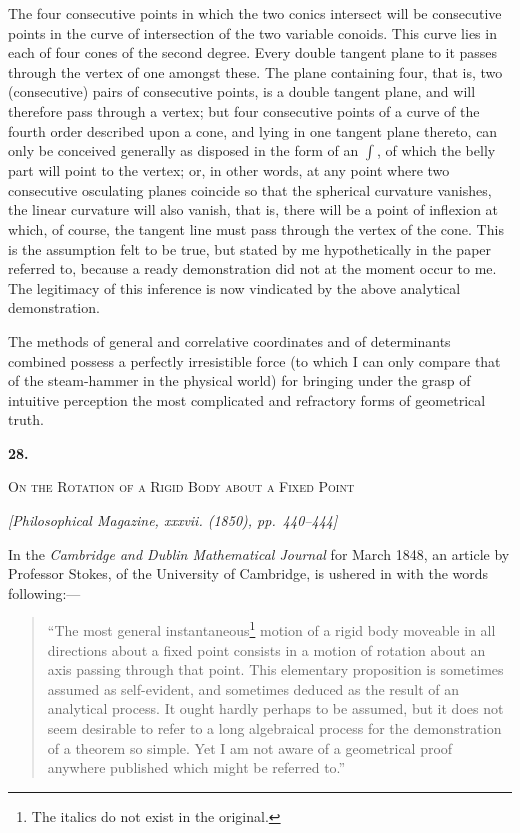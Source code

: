 \documentclass[11pt]{article}
\newcommand{\paperhead}[3]{%
  \clearpage
  \begin{center}
  {\Large\bfseries #1.}\par\vspace{0.85em}
  {\large\scshape #2}\par\vspace{0.6em}
  {\itshape [#3]}\par
  \end{center}\vspace{0.4em}}
\newcommand{\sourcepage}[1]{\marginpar{\scriptsize p.~#1}}
\begin{document}
{{\sourcepage{156}
The four consecutive points in which the two conics intersect will be consecutive points in the curve of intersection of the two variable conoids. This curve lies in each of four cones of the second degree. Every double tangent plane to it passes through the vertex of one amongst these. The plane containing four, that is, two (consecutive) pairs of consecutive points, is a double tangent plane, and will therefore pass through a vertex; but four consecutive points of a curve of the fourth order described upon a cone, and lying in one tangent plane thereto, can only be conceived generally as disposed in the form of an $\int$, of which the belly part will point to the vertex; or, in other words, at any point where two consecutive osculating planes coincide so that the spherical curvature vanishes, the linear curvature will also vanish, that is, there will be a point of inflexion at which, of course, the tangent line must pass through the vertex of the cone. This is the assumption felt to be true, but stated by me hypothetically in the paper referred to, because a ready demonstration did not at the moment occur to me. The legitimacy of this inference is now vindicated by the above analytical demonstration.

The methods of general and correlative coordinates and of determinants combined possess a perfectly irresistible force (to which I can only compare that of the steam-hammer in the physical world) for bringing under the grasp of intuitive perception the most complicated and refractory forms of geometrical truth.

\paperhead{28}{On the Rotation of a Rigid Body about a Fixed Point}{Philosophical Magazine, xxxvii. (1850), pp.~440--444}

\sourcepage{157}
In the \emph{Cambridge and Dublin Mathematical Journal} for March 1848, an article by Professor Stokes, of the University of Cambridge, is ushered in with the words following:---
\begin{quotation}
``The most general instantaneous\footnote{The italics do not exist in the original.} motion of a rigid body moveable in all directions about a fixed point consists in a motion of rotation about an axis passing through that point. This elementary proposition is sometimes assumed as self-evident, and sometimes deduced as the result of an analytical process. It ought hardly perhaps to be assumed, but it does not seem desirable to refer to a long algebraical process for the demonstration of a theorem so simple. Yet I am not aware of a geometrical proof anywhere published which might be referred to.''
\end{quotation}

}}
\end{document}
